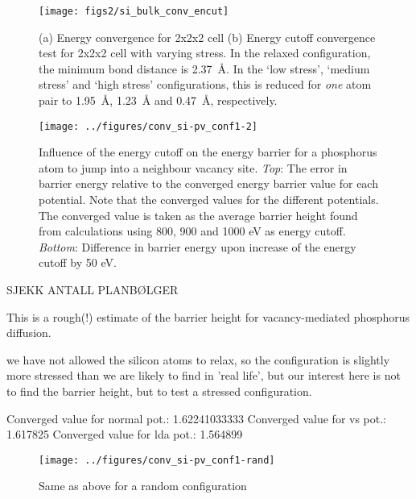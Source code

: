 \documentclass[11pt,bibliography=totoc,index=totoc]{scrbook}   %
\begin{document}
\begin{figure}[htbp]
  \begin{center}
    \texttt{[image: figs2/si\_bulk\_conv\_encut]}
  \end{center}
  \caption{
  (a) Energy convergence for 2x2x2 cell
  (b) Energy cutoff convergence test for 2x2x2 cell with varying stress. In the relaxed configuration, the minimum bond distance
  is \SI{2.37}{\angstrom}. In the `low stress', `medium stress' and `high stress' configurations, this is reduced for 
  \emph{one} atom pair to \SI{1.95}{\angstrom}, \SI{1.23}{\angstrom} and \SI{0.47}{\angstrom}, respectively.}
  \label{fig:figs/si64_bulk_conv_encut_stress}
\end{figure}

\begin{figure}[htbp]
  \begin{center}
    \texttt{[image: ../figures/conv\_si-pv\_conf1-2]}
  \end{center}
  \caption{Influence of the energy cutoff on the energy barrier for a phosphorus atom to jump into a neighbour vacancy site. 
  \textit{Top}: The error in barrier energy relative to the converged energy barrier value for each potential. 
  Note that the converged values for the different potentials.
  The converged value is taken as the average barrier height found from calculations using 800, 900 and 1000 eV as energy cutoff.
  \textit{Bottom}: Difference in barrier energy upon increase of the energy cutoff by 50 eV.}
  \label{fig:figs/conv_si-pv_conf1-2}
\end{figure}


SJEKK ANTALL PLANBØLGER

This is a rough(!) estimate of the barrier height for vacancy-mediated phosphorus diffusion.

we have not allowed the silicon atoms to relax, so the configuration is slightly more stressed than 
we are likely to find in 'real life', but our interest here is not to find the barrier height, but 
to test a stressed configuration.

Converged value for normal pot.: 1.62241033333
Converged value for vs pot.: 1.617825
Converged value for lda pot.: 1.564899


\begin{figure}[htbp]
  \begin{center}
    \texttt{[image: ../figures/conv\_si-pv\_conf1-rand]}
  \end{center}
  \caption{Same as above for a random configuration}
  \label{fig:figs/conv_si-pv_conf1-rand}
\end{figure}
\end{document}
